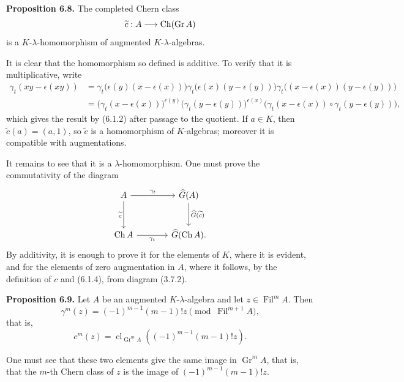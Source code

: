 \documentclass[11pt]{article}
\newcommand{\Gr}{\operatorname{Gr}}
\newcommand{\Fil}{\operatorname{Fil}}
\newcommand{\cl}{\operatorname{cl}}
\providecommand{\Gr}{\operatorname{Gr}}
\providecommand{\Gr}{\operatorname{G}}
\begin{document}
\textbf{Proposition 6.8.} The completed Chern class
\[
  \widetilde c:A\longrightarrow\Ch(\Gr A)
\]
is a \(K\)-\(\lambda\)-homomorphism of augmented \(K\)-\(\lambda\)-algebras.

It is clear that the homomorphism so defined is additive. To verify that it is multiplicative, write
\[
\begin{aligned}
\gamma_t(xy-\epsilon(xy))
&=\gamma_t\bigl(\epsilon(y)(x-\epsilon(x))\bigr)
  \gamma_t\bigl(\epsilon(x)(y-\epsilon(y))\bigr)
  \gamma_t\bigl((x-\epsilon(x))(y-\epsilon(y))\bigr)\\
&=\bigl(\gamma_t(x-\epsilon(x))\bigr)^{\epsilon(y)}
  \bigl(\gamma_t(y-\epsilon(y))\bigr)^{\epsilon(x)}
  \bigl(\gamma_t(x-\epsilon(x))\circ\gamma_t(y-\epsilon(y))\bigr),
\end{aligned}
\]
which gives the result by (6.1.2) after passage to the quotient. If \(a\in K\), then \(\widetilde c(a)=(a,1)\), so \(\widetilde c\) is a homomorphism of \(K\)-algebras; moreover it is compatible with augmentations.

It remains to see that it is a \(\lambda\)-homomorphism. One must prove the commutativity of the diagram
\[
\begin{tikzcd}[column sep=large,row sep=large]
A \arrow[r,"\gamma_t"] \arrow[d,"\widetilde c"'] &
\Ghat(A) \arrow[d,"\Ghat(\widetilde c)"]\\
\Ch A \arrow[r,"\gamma_t"'] &
\Ghat(\Ch A).
\end{tikzcd}
\]
By additivity, it is enough to prove it for the elements of \(K\), where it is evident, and for the elements of zero augmentation in \(A\), where it follows, by the definition of \(c\) and (6.1.4), from diagram (3.7.2).

\textbf{Proposition 6.9.} Let \(A\) be an augmented \(K\)-\(\lambda\)-algebra and let \(z\in\Fil^mA\). Then
\[
  \gamma^m(z)=(-1)^{m-1}(m-1)!z\pmod{\Fil^{m+1}A},
\]
that is,
\[
  c^m(z)=\cl_{\Gr^mA}\!\left((-1)^{m-1}(m-1)!z\right).
\]

One must see that these two elements give the same image in \(\Gr^mA\), that is, that the \(m\)-th Chern class of \(z\) is the image of \((-1)^{m-1}(m-1)!z\).
\end{document}
